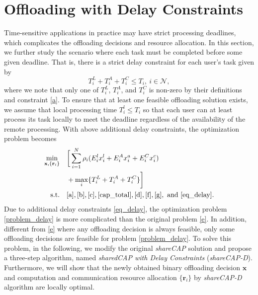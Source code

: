 \documentclass[10pt,journal,compsoc]{IEEEtran}
\begin{document}
{\section{Offloading with Delay Constraints}\label{sec_delay}
Time-sensitive applications in practice may have strict processing
deadlines, which complicates the offloading decisions and resource
allocation. In this section, we further study the scenario where
each task must be completed before some given deadline. That is,
there is a strict delay constraint for each user's task given by
\begin{equation}\label{eq_delay}
T^L_{i}+T^A_{i}+T^C_{i}\leq T_i,\ i \in\mathcal{N},
\end{equation}
where we note that only one of $T_i^L$, $T_i^A$, and $T_i^C$ is
non-zero by their definitions and constraint \eqref{a}. To ensure
that at least one feasible offloading solution exists, we assume
that local processing time $T^l_i\leq T_i$ so that each user can at
least process its task locally to meet the deadline regardless of
the availability of the remote processing. With above additional
delay constraints, the optimization problem becomes
\begin{align}
\min\limits_{\mathbf{x}, \{ \mathbf{r}_i \} }
&\quad \bigg[\sum_{i=1}^N\rho_i(E^l_{i}x^l_{i}+E^A_ix^a_{i}+E^C_ix^c_{i})\nonumber\\
&\quad +\max_{i}\{T^L_{i}+T^A_{i}+T^C_{i}\}\bigg]\label{problem_delay}\allowdisplaybreaks\\
\text{s.t.} &\quad
\eqref{a},\eqref{b},\eqref{c},\eqref{cap_total},\eqref{d},\eqref{f},\eqref{g},\
\mathrm{and}\ \eqref{eq_delay}.\nonumber
\end{align}
Due to additional delay constraints \eqref{eq_delay}, the
optimization problem \eqref{problem_delay} is more complicated than
the original problem \eqref{e}. In addition, different from
\eqref{e} where any offloading decision is always feasible, only
some offloading decisions are feasible for problem
\eqref{problem_delay}. To solve this problem, in the following, we
modify the original \textit{shareCAP} solution and propose a
three-step algorithm, named \textit{sharedCAP with Delay
Constraints} (\textit{shareCAP-D}). Furthermore, we will show that
the newly obtained binary offloading decision $\mathbf{x}$ and
computation and communication resource allocation $\{ \mathbf{r}_i
\}$ by \textit{shareCAP-D} algorithm are locally optimal.

}
\end{document}

